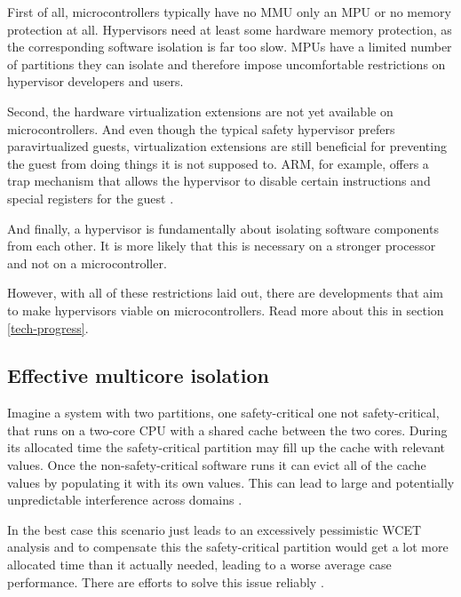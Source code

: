First of all, microcontrollers typically have no \gls{MMU} only an \gls{MPU} or no memory protection at all. Hypervisors need at least some hardware memory protection, as the corresponding software isolation is far too slow. \gls{MPU}s have a limited number of partitions they can isolate and therefore impose uncomfortable restrictions on hypervisor developers and users.

Second, the hardware virtualization extensions are not yet available on microcontrollers. And even though the typical safety hypervisor prefers paravirtualized guests, virtualization extensions are still beneficial for preventing the guest from doing things it is not supposed to. ARM, for example, offers a trap mechanism that allows the hypervisor to disable certain instructions and special registers for the guest \cite{ARM.v8.2018}. 

And finally, a hypervisor is fundamentally about isolating software components from each other. It is more likely that this is necessary on a stronger processor and not on a microcontroller.

However, with all of these restrictions laid out, there are developments that aim to make hypervisors viable on microcontrollers. Read more about this in section \ref{tech-progress}.

\subsection{Effective multicore isolation}
Imagine a system with two partitions, one safety-critical one not safety-critical, that runs on a two-core \gls{CPU} with a shared cache between the two cores. During its allocated time the safety-critical partition may fill up the cache with relevant values. Once the non-safety-critical software runs it can evict all of the cache values by populating it with its own values. This can lead to large and potentially unpredictable interference across domains \cite{AlessandroBiondi.2018}.

In the best case this scenario just leads to an excessively pessimistic \gls{WCET} analysis and to compensate this the safety-critical partition would get a lot more allocated time than it actually needed, leading to a worse average case performance. There are efforts to solve this issue reliably \cite{PaoloModica.2018}.


